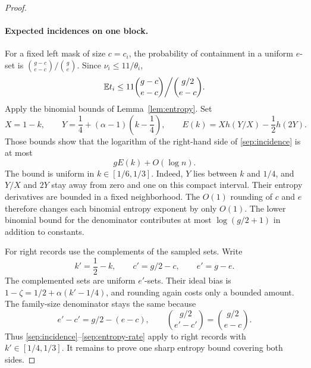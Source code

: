 \begin{proof}
\paragraph{Expected incidences on one block.}
For a fixed left mask of size $c=c_i$, the probability of containment
in a uniform $e$-set is
$\binom{g-c}{e-c}/\binom{g}{e}$. Since
$\nu_i\le11/\theta_i$,
\begin{equation}\label{sep:incidence}
 \mathbb E t_i\le
 11\binom{g-c}{e-c}\bigg/\binom{g/2}{e-c}.
\end{equation}
Apply the binomial bounds of Lemma~\ref{lem:entropy}.
Set
\[
 X=1-k,\qquad
 Y=\frac14+(\alpha-1)\left(k-\frac14\right),\qquad
 E(k)=Xh(Y/X)-\frac12h(2Y).
\]
Those bounds show that the logarithm of the
right-hand side of \eqref{sep:incidence} is at most
\begin{equation}\label{sep:entropy-rate}
 gE(k)+O(\log n).
\end{equation}
The bound is uniform in $k\in[1/6,1/3]$. Indeed, $Y$ lies between
$k$ and $1/4$, and $Y/X$ and $2Y$ stay away from zero and one on
this compact interval. Their entropy derivatives are bounded in a
fixed neighborhood. The $O(1)$ rounding of $c$ and $e$ therefore
changes each binomial entropy exponent by only $O(1)$. The lower
binomial bound for the denominator contributes at most
$\log(g/2+1)$ in addition to constants.

For right records use the complements of the sampled sets. Write
\[
 k'=\frac12-k,\qquad c'=g/2-c,\qquad e'=g-e.
\]
The complemented sets are uniform $e'$-sets. Their ideal bias is
$1-\zeta=1/2+\alpha(k'-1/4)$, and rounding again costs only a
bounded amount. The family-size denominator stays the same because
\[
 e'-c'=g/2-(e-c),\qquad
 \binom{g/2}{e'-c'}=\binom{g/2}{e-c}.
\]
Thus \eqref{sep:incidence}--\eqref{sep:entropy-rate} apply to
right records with $k'\in[1/4,1/3]$. It remains to prove one sharp
entropy bound covering both sides.


\end{proof}
